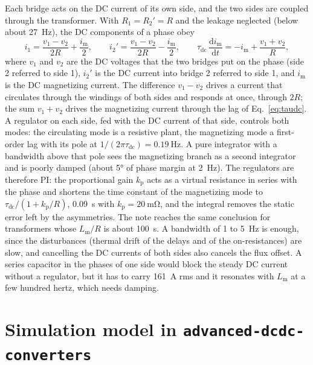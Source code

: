 \documentclass[12pt,a4paper]{scrartcl}
\newcommand{\ped}[1]{_{\mathrm{#1}}}
\newcommand{\code}[1]{\texttt{#1}}
\begin{document}
\begin{onehalfspace}
Each bridge acts on the DC current of its own side, and the two sides are coupled through the transformer. With $R\ped{1} = R\ped{2}' = R$ and the leakage neglected (below about \SI{27}{\hertz}), the DC components of a phase obey
\begin{equation}
	i\ped{1} = \frac{v\ped{1} - v\ped{2}}{2R} + \frac{i\ped{m}}{2}, \qquad
	i\ped{2}' = \frac{v\ped{1} - v\ped{2}}{2R} - \frac{i\ped{m}}{2}, \qquad
	\tau\ped{dc}\,\frac{\mathrm{d}i\ped{m}}{\mathrm{d}t} = -i\ped{m} + \frac{v\ped{1} + v\ped{2}}{R},
	\label{eq:dcmodes}
\end{equation}
where $v\ped{1}$ and $v\ped{2}$ are the DC voltages that the two bridges put on the phase (side 2 referred to side 1), $i\ped{2}'$ is the DC current into bridge 2 referred to side 1, and $i\ped{m}$ is the DC magnetizing current. The difference $v\ped{1} - v\ped{2}$ drives a current that circulates through the windings of both sides and responds at once, through $2R$; the sum $v\ped{1} + v\ped{2}$ drives the magnetizing current through the lag of Eq.~\eqref{eq:taudc}. A regulator on each side, fed with the DC current of that side, controls both modes: the circulating mode is a resistive plant, the magnetizing mode a first-order lag with its pole at $1/(2\pi\tau\ped{dc}) = \SI{0.19}{\hertz}$. A pure integrator with a bandwidth above that pole sees the magnetizing branch as a second integrator and is poorly damped (about \ang{5} of phase margin at \SI{2}{\hertz}). The regulators are therefore PI: the proportional gain $k\ped{p}$ acts as a virtual resistance in series with the phase and shortens the time constant of the magnetizing mode to $\tau\ped{dc}/(1 + k\ped{p}/R)$, \SI{0.09}{\second} with $k\ped{p} = \SI{20}{\milli\ohm}$, and the integral removes the static error left by the asymmetries. The note \cite{dcbias_note} reaches the same conclusion for transformers whose $L\ped{m}/R$ is about \SI{100}{\second}. A bandwidth of 1 to \SI{5}{\hertz} is enough, since the disturbances (thermal drift of the delays and of the on-resistances) are slow, and cancelling the DC currents of both sides also cancels the flux offset. A series capacitor in the phases of one side would block the steady DC current without a regulator, but it has to carry \SI{161}{\ampere} rms and it resonates with $L\ped{m}$ at a few hundred hertz, which needs damping.

\section{Simulation model in \code{advanced-dcdc-converters}}
\label{sec:model}


\end{onehalfspace}
\end{document}
